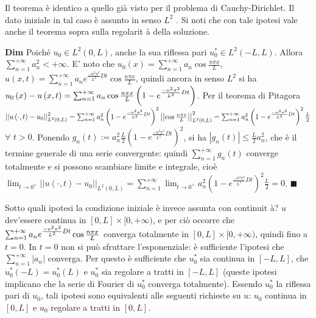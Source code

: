 \documentclass{article}
\begin{document}
Il teorema \`{e} identico a quello gi\`{a} visto per il problema di
Cauchy-Dirichlet. Il dato iniziale in tal caso \`{e} assunto in senso $L^{2}$%
. Si noti che con tale ipotesi vale anche il teorema sopra sulla regolarit%
\`{a} della soluzione.

\textbf{Dim} Poich\'{e} $u_{0}\in L^{2}\left( 0,L\right) $, anche la sua
riflessa pari $u_{0}^{\ast }\in L^{2}\left( -L,L\right) $. Allora $%
\sum_{n=1}^{+\infty }a_{n}^{2}<+\infty $. E' noto che $u_{0}\left( x\right)
=\sum_{n=1}^{+\infty }a_{n}\cos \frac{n\pi x}{L}$, $u\left( x,t\right)
=\sum_{n=1}^{+\infty }a_{n}e^{\frac{-n^{2}\pi ^{2}}{L^{2}}Dt}\cos \frac{n\pi
x}{L}$, quindi ancora in senso $L^{2}$ si ha $u_{0}\left( x\right) -u\left(
x,t\right) =\sum_{n=1}^{+\infty }a_{n}\cos \frac{n\pi x}{L}\left( 1-e^{\frac{%
-n^{2}\pi ^{2}}{L^{2}}Dt}\right) $. Per il teorema di Pitagora $\left\vert
\left\vert u\left( \cdot ,t\right) -u_{0}\right\vert \right\vert
_{L^{2}\left( 0,L\right) }^{2}=\sum_{n=1}^{+\infty }a_{n}^{2}\left( 1-e^{%
\frac{-n^{2}\pi ^{2}}{L^{2}}Dt}\right) ^{2}\left\vert \left\vert \cos \frac{%
n\pi x}{L}\right\vert \right\vert _{L^{2}\left( 0,L\right)
}^{2}=\sum_{n=1}^{+\infty }a_{n}^{2}\left( 1-e^{\frac{-n^{2}\pi ^{2}}{L^{2}}%
Dt}\right) ^{2}\frac{L}{2}$ $\forall $ $t>0$. Ponendo $g_{n}\left( t\right)
:=a_{n}^{2}\frac{L}{2}\left( 1-e^{\frac{-n^{2}\pi ^{2}}{L^{2}}Dt}\right)
^{2} $, si ha $\left\vert g_{n}\left( t\right) \right\vert \leq \frac{L}{2}%
a_{n}^{2}$, che \`{e} il termine generale di una serie convergente: quindi $%
\sum_{n=1}^{+\infty }g_{n}\left( t\right) $ converge totalmente e si possono
scambiare limite e integrale, cio\`{e} $\lim_{t\rightarrow 0^{+}}\left\vert
\left\vert u\left( \cdot ,t\right) -u_{0}\right\vert \right\vert
_{L^{2}\left( 0,L\right) }=\sum_{n=1}^{+\infty }\lim_{t\rightarrow
0^{+}}a_{n}^{2}\left( 1-e^{\frac{-n^{2}\pi ^{2}}{L^{2}}Dt}\right) ^{2}\frac{L%
}{2}=0$. $\blacksquare $

Sotto quali ipotesi la condizione iniziale \`{e} invece assunta con continuit%
\`{a}? $u$ dev'essere continua in $\left[ 0,L\right] \times \lbrack
0,+\infty )$, e per ci\`{o} occorre che $\sum_{n=1}^{+\infty }a_{n}e^{\frac{%
-n^{2}\pi ^{2}}{L^{2}}Dt}\cos \frac{n\pi x}{L}$ converga totalmente in $%
\left[ 0,L\right] \times \lbrack 0,+\infty )$, quindi fino a $t=0$. In $t=0$
non si pu\`{o} sfruttare l'esponenziale: \`{e} sufficiente l'ipotesi che $%
\sum_{n=1}^{+\infty }\left\vert a_{n}\right\vert $ converga. Per questo \`{e}
sufficiente che $u_{0}^{\ast }$ sia continua in $\left[ -L,L\right] $, che $%
u_{0}^{\ast }\left( -L\right) =u_{0}^{\ast }\left( L\right) $ e $u_{0}^{\ast
}$ sia regolare a tratti in $\left[ -L,L\right] $ (queste ipotesi implicano
che la serie di Fourier di $u_{0}^{\ast }$ converga totalmente). Essendo $%
u_{0}^{\ast }$ la riflessa pari di $u_{0}$, tali ipotesi sono equivalenti
alle seguenti richieste su $u$: $u_{0}$ continua in $\left[ 0,L\right] $ e $%
u_{0}$ regolare a tratti in $\left[ 0,L\right] $.
\end{document}
